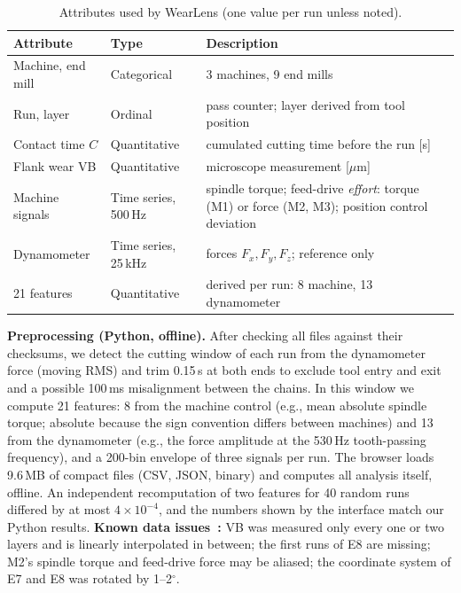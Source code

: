 \documentclass{vgtc}                          %
\begin{document}
\begin{table}[tb]
  \caption{Attributes used by WearLens (one value per run unless noted).}
  \label{tab:attributes}
  \scriptsize\centering
  \begin{tabular}{@{}p{}p{}p{}@{}}
    \toprule
    Attribute & Type & Description \\
    \midrule
    Machine, end mill & Categorical & 3 machines, 9 end mills \\
    Run, layer & Ordinal & pass counter; layer derived from tool position \\
    Contact time $C$ & Quantitative & cumulated cutting time before the run [s] \\
    Flank wear VB & Quantitative & microscope measurement [$\mu$m] \\
    Machine signals & Time series, 500\,Hz & spindle torque; feed-drive \emph{effort}: torque (M1) or force (M2, M3); position control deviation \\
    Dynamometer & Time series, 25\,kHz & forces $F_x, F_y, F_z$; reference only \\
    21 features & Quantitative & derived per run: 8 machine, 13 dynamometer \\
    \bottomrule
  \end{tabular}
\end{table}

\textbf{Preprocessing (Python, offline).} After checking all files against their checksums, we detect the cutting window
of each run from the dynamometer force (moving RMS) and trim 0.15\,s at both ends to exclude tool entry and exit and a
possible 100\,ms misalignment between the chains. In this window we compute 21 features: 8 from the machine control
(e.g., mean absolute spindle torque; absolute because the sign convention differs between machines) and 13 from the
dynamometer (e.g., the force amplitude at the 530\,Hz tooth-passing frequency), and a 200-bin envelope of three signals
per run. The browser loads 9.6\,MB of compact files (CSV, JSON, binary) and computes all analysis itself, offline. An
independent recomputation of two features for 40 random runs differed by at most $4\times10^{-4}$, and the numbers shown
by the interface match our Python results. \textbf{Known data issues~\cite{denkena2023}:} VB was measured only every one or
two layers and is linearly interpolated in between; the first runs of E8 are missing; M2's spindle torque and feed-drive
force may be aliased; the coordinate system of E7 and E8 was rotated by 1--2$^\circ$.
\end{document}
